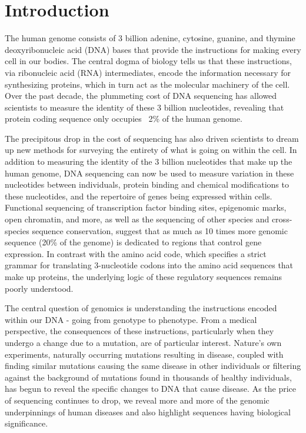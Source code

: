 \chapter{Introduction}
\label{chap:intro}

The human genome consists of 3 billion adenine, cytosine, guanine, and thymine deoxyribonucleic acid (DNA) bases that provide the instructions for making every cell in our bodies. The central dogma of biology tells us that these instructions, via ribonucleic acid (RNA) intermediates, encode the information necessary for synthesizing proteins, which in turn act as the molecular machinery of the cell. Over the past decade, the plummeting cost of DNA sequencing has allowed scientists to measure the identity of these 3 billion nucleotides, revealing that protein coding sequence only occupies ~2\% of the human genome.

The precipitous drop in the cost of sequencing has also driven scientists to dream up new methods for surveying the entirety of what is going on within the cell. In addition to measuring the identity of the 3 billion nucleotides that make up the human genome, DNA sequencing can now be used to measure variation in these nucleotides between individuals, protein binding and chemical modifications to these nucleotides, and the repertoire of genes being expressed within cells. Functional sequencing of transcription factor binding sites, epigenomic marks, open chromatin, and more, as well as the sequencing of other species and cross-species sequence conservation, suggest that as much as 10 times more genomic sequence (20\% of the genome) is dedicated to regions that control gene expression. In contrast with the amino acid code, which specifies a strict grammar for translating 3-nucleotide codons into the amino acid sequences that make up proteins, the underlying logic of these regulatory sequences remains poorly understood.

The central question of genomics is understanding the instructions encoded within our DNA - going from genotype to phenotype. From a medical perspective, the consequences of these instructions, particularly when they undergo a change due to a mutation, are of particular interest. Nature's own experiments, naturally occurring mutations resulting in disease, coupled with finding similar mutations causing the same disease in other individuals or filtering against the background of mutations found in thousands of healthy individuals, has begun to reveal the specific changes to DNA that cause disease. As the price of sequencing continues to drop, we reveal more and more of the genomic underpinnings of human diseases and also highlight sequences having biological significance.

